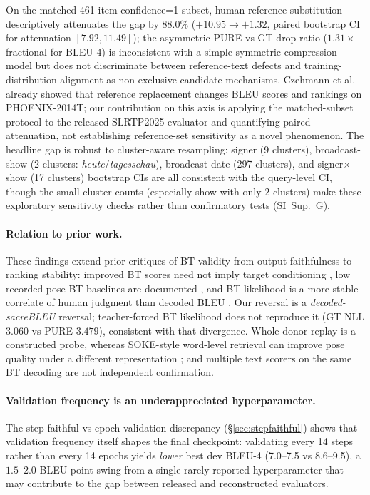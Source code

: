 \documentclass[pdflatex,sn-chicago]{sn-jnl}
\begin{document}
On the matched 461-item confidence=1 subset, human-reference substitution descriptively attenuates the gap by $88.0\%$ ($+10.95 \to +1.32$, paired bootstrap CI for attenuation $[7.92, 11.49]$); the asymmetric PURE-vs-GT drop ratio ($1.31\times$ fractional for BLEU-4) is inconsistent with a simple symmetric compression model but does not discriminate between reference-text defects and training-distribution alignment as non-exclusive candidate mechanisms. Czehmann et al.~\cite{czehmann2026sacred} already showed that reference replacement changes BLEU scores and rankings on PHOENIX-2014T; our contribution on this axis is applying the matched-subset protocol to the released SLRTP2025 evaluator and quantifying paired attenuation, not establishing reference-set sensitivity as a novel phenomenon. The headline gap is robust to cluster-aware resampling: signer (9 clusters), broadcast-show (2 clusters: \emph{heute}/\emph{tagesschau}), broadcast-date (297 clusters), and signer$\times$show (17 clusters) bootstrap CIs are all consistent with the query-level CI, though the small cluster counts (especially show with only 2 clusters) make these exploratory sensitivity checks rather than confirmatory tests (SI~Sup.~G).

\paragraph{Relation to prior work.}
These findings extend prior critiques of BT validity from output faithfulness to ranking stability: improved BT scores need not imply target conditioning \cite{hong2026conditional}, low recorded-pose BT baselines are documented \cite{walsh2024datadriven}, and BT likelihood is a more stable correlate of human judgment than decoded BLEU \cite{jiang2025meaningful}. Our reversal is a \emph{decoded-sacreBLEU} reversal; teacher-forced BT likelihood does not reproduce it (GT NLL $3.060$ vs PURE $3.479$), consistent with that divergence. Whole-donor replay is a constructed probe, whereas SOKE-style word-level retrieval can improve pose quality under a different representation \cite{soke}; and multiple text scorers on the same BT decoding are not independent confirmation.

\paragraph{Validation frequency is an underappreciated hyperparameter.}
The step-faithful vs epoch-validation discrepancy (\S\ref{sec:stepfaithful}) shows that validation frequency itself shapes the final checkpoint: validating every 14 steps rather than every 14 epochs yields \emph{lower} best dev BLEU-4 (7.0--7.5 vs 8.6--9.5), a $1.5$--$2.0$ BLEU-point swing from a single rarely-reported hyperparameter that may contribute to the gap between released and reconstructed evaluators.
\end{document}
